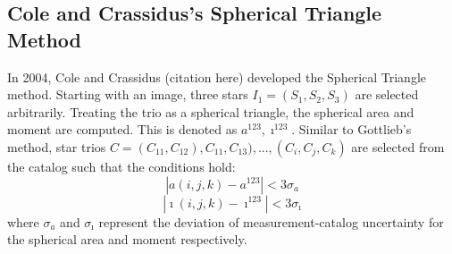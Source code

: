 \subsection{Cole and Crassidus's Spherical Triangle Method}
In 2004, Cole and Crassidus (citation here) developed the Spherical Triangle method. Starting with an image, three stars $I_1 = (S_1, S_2, S_3)$ are selected arbitrarily. Treating the trio as a spherical triangle, the spherical area and moment are computed. This is denoted as $a^{123}, \imath^{123}$. Similar to Gottlieb's method, star trios $C = (C_{11}, C_{12}), C_{11}, C_{13}), ..., (C_i, C_j, C_k)$ are selected from the catalog such that the conditions hold:
\begin{equation}
| a(i, j, k) - a^{123} | < 3 \sigma_a
\end{equation}
\begin{equation}
| \imath(i, j, k) - \imath^{123} | < 3\sigma_{\imath}
\end{equation}
where $\sigma_a$ and $\sigma_{\imath}$ represent the deviation of measurement-catalog uncertainty for the spherical area and moment respectively. 

